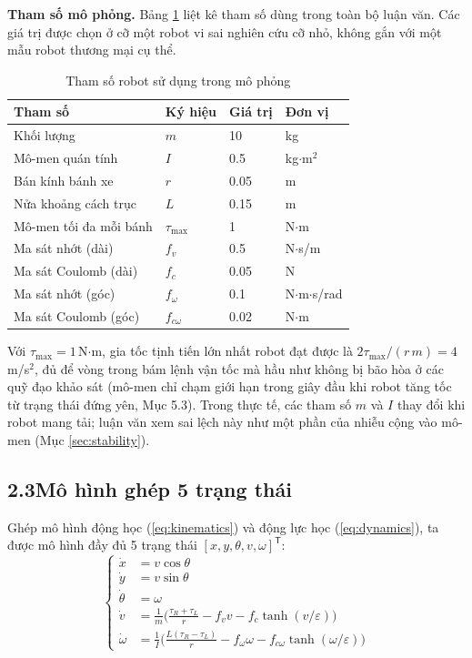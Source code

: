 \documentclass[12pt,a4paper]{article}
\newcommand{\T}{\mathsf{T}}
\begin{document}
\textbf{Tham số mô phỏng.} Bảng \ref{tab:robot_params} liệt kê tham số dùng trong toàn bộ luận văn. Các giá trị được chọn ở cỡ một robot vi sai nghiên cứu cỡ nhỏ, không gắn với một mẫu robot thương mại cụ thể.

\begin{table}[H]
\centering
\caption{Tham số robot sử dụng trong mô phỏng}
\label{tab:robot_params}
\begin{tabular}{llll}
\toprule
\textbf{Tham số} & \textbf{Ký hiệu} & \textbf{Giá trị} & \textbf{Đơn vị} \\
\midrule
Khối lượng & $m$ & 10 & kg \\
Mô-men quán tính & $I$ & 0.5 & kg$\cdot$m$^2$ \\
Bán kính bánh xe & $r$ & 0.05 & m \\
Nửa khoảng cách trục & $L$ & 0.15 & m \\
Mô-men tối đa mỗi bánh & $\tau_\text{max}$ & 1 & N$\cdot$m \\
Ma sát nhớt (dài) & $f_v$ & 0.5 & N$\cdot$s/m \\
Ma sát Coulomb (dài) & $f_c$ & 0.05 & N \\
Ma sát nhớt (góc) & $f_\omega$ & 0.1 & N$\cdot$m$\cdot$s/rad \\
Ma sát Coulomb (góc) & $f_{c\omega}$ & 0.02 & N$\cdot$m \\
\bottomrule
\end{tabular}
\end{table}

Với $\tau_\text{max} = 1$\,N$\cdot$m, gia tốc tịnh tiến lớn nhất robot đạt được là $2\tau_\text{max}/(r\,m) = 4$\,m/s$^2$, đủ để vòng trong bám lệnh vận tốc mà hầu như không bị bão hòa ở các quỹ đạo khảo sát (mô-men chỉ chạm giới hạn trong giây đầu khi robot tăng tốc từ trạng thái đứng yên, Mục 5.3). Trong thực tế, các tham số $m$ và $I$ thay đổi khi robot mang tải; luận văn xem sai lệch này như một phần của nhiễu cộng vào mô-men (Mục \ref{sec:stability}).

\subsection*{2.3\quad Mô hình ghép 5 trạng thái}

Ghép mô hình động học (\ref{eq:kinematics}) và động lực học (\ref{eq:dynamics}), ta được mô hình đầy đủ 5 trạng thái $[x, y, \theta, v, \omega]^\T$:
\begin{equation}\label{eq:full_model}
    \left\{
    \begin{aligned}
        \dot x &= v\cos\theta \\
        \dot y &= v\sin\theta \\
        \dot\theta &= \omega \\
        \dot v &= \frac{1}{m}\Big(\frac{\tau_R + \tau_L}{r} - f_v v - f_c\tanh(v/\varepsilon)\Big) \\
        \dot\omega &= \frac{1}{I}\Big(\frac{L(\tau_R - \tau_L)}{r} - f_\omega\omega - f_{c\omega}\tanh(\omega/\varepsilon)\Big)
    \end{aligned}
    \right.
\end{equation}
\end{document}
